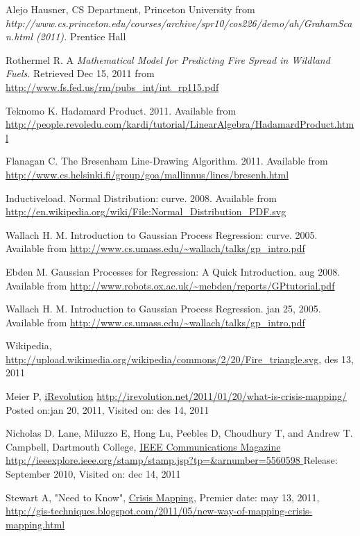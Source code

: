 
\begin{thebibliography}{4}
 Alejo Hausner, CS Department, Princeton University from
 \emph{http://www.cs.princeton.edu/courses/archive/spr10/cos226/demo/ah/GrahamScan.html (2011).} Prentice Hall
 
 Rothermel R. A \emph{Mathematical Model for Predicting Fire Spread in Wildland Fuels}. Retrieved Dec 15, 2011 from \url{http://www.fs.fed.us/rm/pubs_int/int_rp115.pdf } 

 
 Teknomo K. Hadamard Product. 2011. Available from \url{http://people.revoledu.com/kardi/tutorial/LinearAlgebra/HadamardProduct.html} 

 Flanagan C. The Bresenham Line-Drawing Algorithm. 2011. Available from \url{http://www.cs.helsinki.fi/group/goa/mallinnus/lines/bresenh.html} 

 Inductiveload. Normal Distribution: curve. 2008. Available from \url{http://en.wikipedia.org/wiki/File:Normal_Distribution_PDF.svg} 

 Wallach H. M. Introduction to Gaussian Process Regression: curve. 2005. Available from \url{http://www.cs.umass.edu/~wallach/talks/gp_intro.pdf} 

 Ebden M. Gaussian Processes for Regression: A Quick Introduction. aug 2008. Available from \url{http://www.robots.ox.ac.uk/~mebden/reports/GPtutorial.pdf} 

 Wallach H. M. Introduction to Gaussian Process Regression. jan 25, 2005. Available from \url{http://www.cs.umass.edu/~wallach/talks/gp_intro.pdf} 

 Wikipedia,       \url{http://upload.wikimedia.org/wikipedia/commons/2/20/Fire_triangle.svg}, des 13, 2011

 Meier P, \underline{iRevolution} \url{http://irevolution.net/2011/01/20/what-is-crisis-mapping/} Posted on:jan 20, 2011, Visited on: des 14, 2011

 Nicholas D. Lane, Miluzzo E, Hong Lu, Peebles D, Choudhury T,
and Andrew T. Campbell, Dartmouth College, \underline{IEEE Communications Magazine} \url{http://ieeexplore.ieee.org/stamp/stamp.jsp?tp=&arnumber=5560598 } Release: September 2010, Visited on: dec 14, 2011

 Stewart A, "Need to Know", \underline{Crisis Mapping}, Premier date: may 13, 2011, \url{http://gis-techniques.blogspot.com/2011/05/new-way-of-mapping-crisis-mapping.html}


\end{thebibliography}
